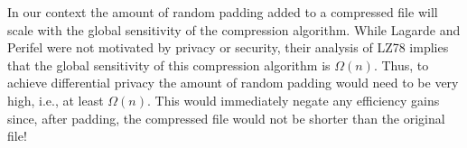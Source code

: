 In our context the amount of random padding added to a compressed file will scale with the global sensitivity of the compression algorithm. While Lagarde and Perifel \cite{lagarde2018lempel} were not motivated by privacy or security, their analysis of LZ78 implies that the global sensitivity of this compression algorithm is $\Omega(n)$. Thus, to achieve differential privacy the amount of random padding would need to be very high, i.e., at least $\Omega(n)$. This would immediately negate any efficiency gains since, after padding, the compressed file would not be shorter than the original file!





